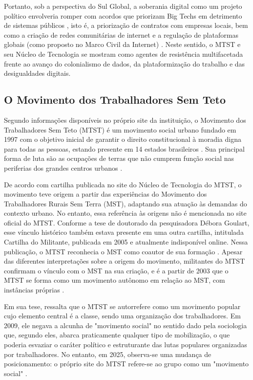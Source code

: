 Portanto, sob a perspectiva do Sul Global, a soberania digital como um projeto político envolveria romper com acordos que priorizam Big Techs em detrimento de sistemas públicos \cite{Souza2024}, isto é, a priorização de contratos com empresas locais, bem como a criação de redes comunitárias de internet e a regulação de plataformas globais (como proposto no Marco Civil da Internet) \cite{silveira-demcodigos}. Neste sentido, o MTST e seu Núcleo de Tecnologia se mostram como agentes de resistência multifacetada frente ao avanço do colonialismo de dados, da plataformização do trabalho e das desigualdades digitais.

\subsection{O Movimento dos Trabalhadores Sem Teto }
\label{subsec:mtst}

Segundo informações disponíveis no próprio site da instituição, o Movimento dos Trabalhadores Sem Teto (MTST) é um movimento social urbano fundado em 1997 com o objetivo inicial de garantir o direito constitucional à moradia digna para todas as pessoas, estando presente em 14 estados brasileiros \cite{mtst_2024}. Sua principal forma de luta são as ocupações de terras que não cumprem função social nas periferias dos grandes centros urbanos \cite{mtst2023cartilha}.

De acordo com cartilha publicada no site do Núcleo de Tecnologia do MTST, o movimento teve origem a partir das experiências do Movimento dos Trabalhadores Rurais Sem Terra (MST), adaptando sua atuação às demandas do contexto urbano. No entanto, essa referência às origens não é mencionada no site oficial do MTST. Conforme a tese de doutorado da pesquisadora Débora Goulart, esse vínculo histórico também estava presente em uma outra cartilha, intitulada Cartilha do Militante, publicada em 2005 e atualmente indisponível online. Nessa publicação, o MTST reconhecia o MST como coautor de sua formação \cite{goulart2011anticapitalismo}. Apesar das diferentes interpretações sobre a origem do movimento, militantes do MTST confirmam o vínculo com o MST na sua criação, e é a partir de 2003 que o MTST se forma como um movimento autônomo em relação ao MST, com instâncias próprias  \cite{goulart2011anticapitalismo}.

Em sua tese, \citeauthor{goulart2011anticapitalismo} ressalta que o MTST se autorrefere como um movimento popular cujo elemento central é a classe, sendo uma organização dos trabalhadores. Em 2009, ele negava a alcunha de "movimento social" no sentido dado pela sociologia que, segundo eles, abarca praticamente qualquer tipo de mobilização, o que poderia esvaziar o caráter político e estruturante das lutas populares organizadas por trabalhadores. No entanto, em 2025, observa-se uma mudança de posicionamento: o próprio site do MTST refere-se ao grupo como um "movimento social" \cite{mtst_2024}. 

